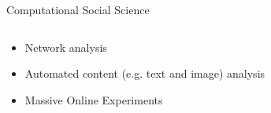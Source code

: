 \documentclass{beamer}
\begin{document}
\begin{frame}{Computational Social Science}
  \begin{columns}
    \begin{column}{0.5\textwidth}    
      \begin{itemize}[<+->]
        \item Network analysis
        \item Automated content (e.g. text and image) analysis
        \item Massive Online Experiments
       \end{itemize}
    \end{column}
    \begin{column}{0.5\textwidth}

\end{column}
\end{columns}
\end{frame}
\end{document}
